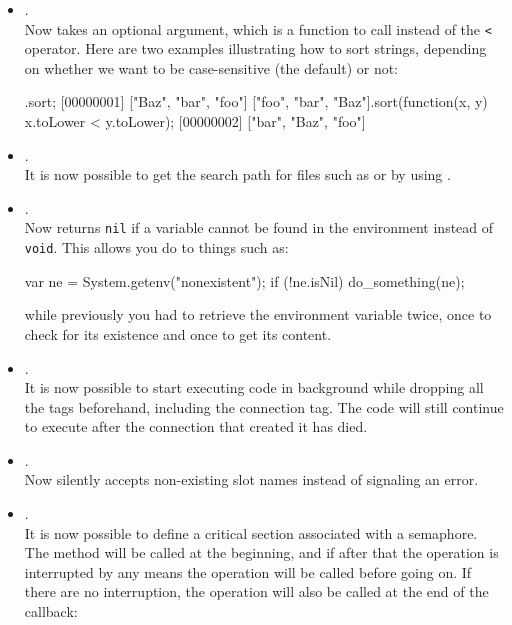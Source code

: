 \begin{itemize}
\item {}.\\
  Now takes an optional argument, which is a function to call instead of the
  \lstinline|<| operator. Here are two examples illustrating how to sort
  strings, depending on whether we want to be case-sensitive (the default)
  or not:

\begin{urbiscript}
.sort;
[00000001] ["Baz", "bar", "foo"]
["foo", "bar", "Baz"].sort(function(x, y) {x.toLower < y.toLower});
[00000002] ["bar", "Baz", "foo"]
\end{urbiscript}

\item {}.\\
  It is now possible to get the search path for files such as 
  or  by using .

\item {}.\\
  Now returns \lstinline{nil} if a variable cannot be found in the
  environment instead of \lstinline{void}. This allows you do to things such
  as:

\begin{urbiscript}
var ne = System.getenv("nonexistent");
if (!ne.isNil) do_something(ne);
\end{urbiscript}

  \noindent
  while previously you had to retrieve the environment variable twice, once
  to check for its existence and once to get its content.

\item {}.\\
  It is now possible to start executing code in background while dropping
  all the tags beforehand, including the connection tag. The code will still
  continue to execute after the connection that created it has died.

\item {}.\\
  Now silently accepts non-existing slot names instead of signaling an
  error.

\item {}.\\
  It is now possible to define a critical section associated with a
  semaphore. The  method will be called at the
  beginning, and if after that the operation is interrupted by any means the
   operation will be called before going on. If
  there are no interruption, the  operation will
  also be called at the end of the callback:


\end{itemize}
